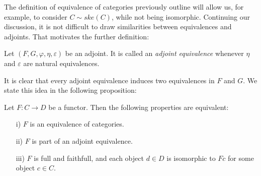 The definition of equivalence of categories previously outline will allow us, for example, to consider $C\sim ske(C)$, while not being isomorphic. Continuing our discussion, it is not difficult to draw similarities between equivalences and adjoints. That motivates the further definition:
\begin{definition}
  Let $(F,G,\varphi,\eta,\varepsilon)$ be an adjoint. It is called an \emph{adjoint equivalence} whenever $\eta$ and $\varepsilon$ are natural equivalences.
\end{definition}
It is clear that every adjoint equivalence induces two equivalences in $F$ and $G$. We state this idea in the following proposition:
\begin{proposition}\cite[Theorem 1, 4.4]{mac2013categories}
  Let $F:C\to D$ be a functor. Then the following properties are equivalent:
  \begin{itemize}
  \item[i)] $F$ is an equivalence of categories.
  \item[ii)] $F$ is part of an adjoint equivalence. 
  \item[iii)] $F$ is full and faithfull, and each object $d\in D$ is isomorphic to $Fc$ for some object $c\in C$.  
  \end{itemize}  
\end{proposition}
